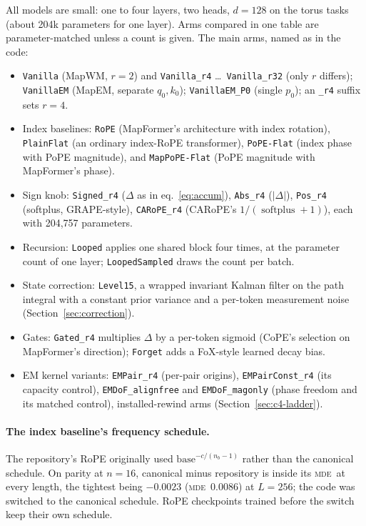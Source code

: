 \documentclass[10pt]{article}
\newcommand{\mde}{\textsc{mde}}
\newcommand{\nb}{n_b}
\newcommand{\arm}[1]{\texttt{#1}}
\DeclareMathOperator{\softplus}{softplus}
\begin{document}
All models are small: one to four layers, two heads, $d=128$ on the torus tasks (about 204k
parameters for one layer). Arms compared in one table are parameter-matched unless a count is
given. The main arms, named as in the code:
\begingroup\sloppy
\begin{itemize}
\item \arm{Vanilla} (MapWM, $r=2$) and \arm{Vanilla\_r4} \ldots\ \arm{Vanilla\_r32} (only
$r$ differs); \arm{VanillaEM} (MapEM, separate $q_0,k_0$); \arm{VanillaEM\_P0} (single $p_0$); an
\arm{\_r4} suffix sets $r=4$.
\item Index baselines: \arm{RoPE} (MapFormer's architecture with index rotation), \arm{PlainFlat}
(an ordinary index-RoPE transformer), \arm{PoPE-Flat} (index phase with PoPE magnitude), and
\arm{MapPoPE-Flat} (PoPE magnitude with MapFormer's phase).
\item Sign knob: \arm{Signed\_r4} ($\Delta$ as in eq.~\ref{eq:accum}), \arm{Abs\_r4} ($|\Delta|$),
\arm{Pos\_r4} (softplus, GRAPE-style), \arm{CARoPE\_r4} (CARoPE's $1/(\softplus+1)$), each with
204,757 parameters. %
\item Recursion: \arm{Looped} applies one shared block four times, at the parameter count of one
layer; \arm{LoopedSampled} draws the count per batch.
\item State correction: \arm{Level15}, a wrapped invariant Kalman filter on the path integral with
a constant prior variance and a per-token measurement noise (Section~\ref{sec:correction}).
\item Gates: \arm{Gated\_r4} multiplies $\Delta$ by a per-token sigmoid (CoPE's selection on
MapFormer's direction); \arm{Forget} adds a FoX-style learned decay bias.
\item EM kernel variants: \arm{EMPair\_r4} (per-pair origins), \arm{EMPairConst\_r4} (its capacity
control), \arm{EMDoF\_alignfree} and \arm{EMDoF\_magonly} (phase freedom and its matched control),
installed-rewind arms (Section~\ref{sec:c4-ladder}).
\end{itemize}
\endgroup

\paragraph{The index baseline's frequency schedule.} The repository's RoPE originally used
$\text{base}^{-c/(\nb-1)}$ rather than the canonical schedule. On parity at $n=16$, canonical minus
repository is inside its \mde\ at every length, the tightest being $-0.0023$ (\mde\ $0.0086$) at
$L=256$; the code was switched to the canonical schedule. RoPE checkpoints trained before the switch
keep their own schedule. %
\end{document}
